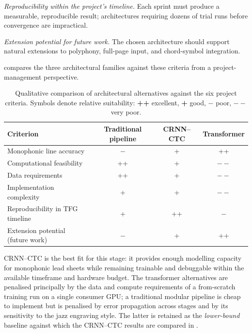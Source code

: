\textit{Reproducibility within the project's timeline.}
Each sprint must produce a measurable, reproducible result; architectures requiring dozens of trial runs before convergence are impractical.

\textit{Extension potential for future work.}
The chosen architecture should support natural extensions to polyphony, full-page input, and chord-symbol integration.

 compares the three architectural families
against these criteria from a project-management perspective.

\begin{table}[ht]
    \centering
    \caption{Qualitative comparison of architectural alternatives
    against the six project criteria.
    Symbols denote relative suitability: \textbf{++} excellent,
    \textbf{+} good, $-$ poor, $--$ very poor.}
    \label{tab:alt-comparison}
    \small
    \setlength{\tabcolsep}{5pt}
    \renewcommand{\arraystretch}{1.35}
    \begin{tabularx}{\linewidth}{@{} >{\raggedright\arraybackslash}p{4.2cm} c c c @{}}
        \toprule
        \textbf{Criterion} & \textbf{Traditional pipeline} & \textbf{CRNN--CTC} & \textbf{Transformer} \\
        \midrule
        Monophonic line accuracy          & $-$  & +  & ++ \\ \tfgrowsep
        Computational feasibility         & ++  & +  & $--$ \\ \tfgrowsep
        Data requirements                 & ++  & +  & $--$ \\ \tfgrowsep
        Implementation complexity         & +   & +  & $--$ \\ \tfgrowsep
        Reproducibility in TFG timeline   & +   & ++ & $-$ \\ \tfgrowsep
        Extension potential (future work) & $-$  & +  & ++ \\
        \bottomrule
    \end{tabularx}
\end{table}

CRNN--CTC is the best fit for this stage: it provides enough modelling capacity for monophonic
lead sheets while remaining trainable and debuggable within the
available timeframe and hardware budget.
The transformer alternatives are penalised principally by the data
and compute requirements of a from-scratch training run on a single
consumer GPU; a traditional modular pipeline is cheap to implement
but is penalised by error propagation across stages and by its
sensitivity to the jazz engraving style.
The latter is retained as the \textit{lower-bound}
baseline against which the CRNN--CTC results are compared in
.


